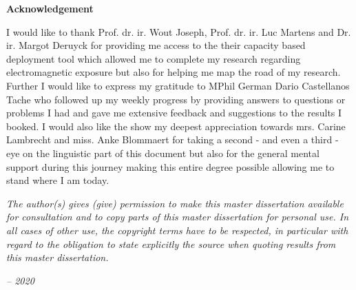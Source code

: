 \thispagestyle{empty}    %

\begin{center}
\textbf{Acknowledgement}
\end{center}

I would like to thank Prof. dr. ir. Wout Joseph, Prof. dr. ir. Luc Martens and Dr. ir. Margot Deruyck
for providing me access to the their capacity based deployment tool which allowed me to 
complete my research regarding electromagnetic exposure but  also for helping me map the road of my research.
Further I would like to express my gratitude to MPhil German Dario Castellanos Tache
who followed up my weekly progress by providing answers to  questions or problems I had and 
gave me extensive feedback and suggestions to the results I booked.
I would also like the show my deepest appreciation towards mrs. Carine Lambrecht and 
miss. Anke Blommaert for taking a second - and even a third - eye on the linguistic part of this document but also for the general 
mental support during this journey making this entire degree possible allowing me to stand where I am today. 

\vspace*{\fill}
\emph{
The author(s) gives (give) permission to make this master dissertation available for
consultation and to copy parts of this master dissertation for personal use.
In all cases of other use, the copyright terms have to be respected, in particular with regard to
the obligation to state explicitly the source when quoting results from this master dissertation.
}
\begin{flushright}
\emph{-- 2020}
\end{flushright}